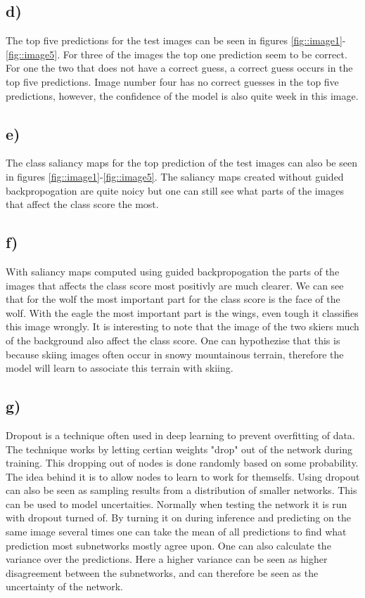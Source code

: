 \documentclass{article}
\begin{document}
\subsection*{d)}
The top five predictions for the test images can be seen in figures \ref{fig::image1}-\ref{fig::image5}. For three of the images the top one prediction seem to be correct. For one the two that does not have a correct guess, a correct guess occurs in the top five predictions. Image number four has no correct guesses in the top five predictions, however, the confidence of the model is also quite week in this image.
\subsection*{e)}
The class saliancy maps for the top prediction of the test images can also be seen in figures \ref{fig::image1}-\ref{fig::image5}. The saliancy maps created without guided backpropogation are quite noicy but one can still see what parts of the images that affect the class score the most.
\subsection*{f)}
With saliancy maps computed using guided backpropogation the parts of the images that affects the class score most positivly are much clearer. We can see that for the wolf the most important part for the class score is the face of the wolf. With the eagle the most important part is the wings, even tough it classifies this image wrongly. It is interesting to note that the image of the two skiers much of the background also affect the class score. One can hypothezise that this is because skiing images often occur in snowy mountainous terrain, therefore the model will learn to associate this terrain with skiing.
\subsection*{g)}
Dropout is a technique often used in deep learning to prevent overfitting of data\cite{dropoutPaper}. The technique works by letting certian weights "drop" out of the network during training. This dropping out of nodes is done randomly based on some probability. The idea behind it is to allow nodes to learn to work for themselfs\cite{dropoutPaper}. Using dropout can also be seen as sampling results from a distribution of smaller networks. This can be used to model uncertaities. Normally when testing the network it is run with dropout turned of. By turning it on during inference and predicting on the same image several times one can take the mean of all predictions to find what prediction most subnetworks mostly agree upon. One can also calculate the variance over the predictions. Here a higher variance can be seen as higher disagreement between the subnetworks, and can therefore be seen as the uncertainty of the network.
\end{document}
